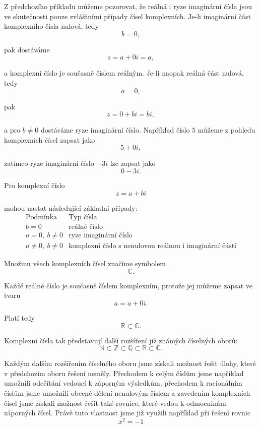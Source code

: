 \documentclass[12pt,a4paper]{article}
\begin{document}
Z předchozího příkladu můžeme pozorovat, 
že reálná i ryze imaginární čísla jsou ve skutečnosti 
pouze zvláštními případy čísel komplexních.
Je-li imaginární část komplexního čísla nulová, tedy
\[
    b=0,
\]

pak dostáváme
\[
    z=a+0i=a,
\]

a komplexní číslo je současně číslem reálným.
Je-li naopak reálná část nulová, tedy
\[
    a=0,
\]

pak
\[
    z=0+bi=bi,
\]

a pro $b\neq0$ dostáváme ryze imaginární číslo.
Například číslo $5$ můžeme z pohledu komplexních čísel zapsat jako
\[
    5+0i,
\]

zatímco ryze imaginární číslo $-3i$ lze zapsat jako
\[
    0-3i.
\]

\begin{notebox}
    Pro komplexní číslo
    \[
        z=a+bi
    \]

    mohou nastat následující základní případy:
    \[
    \begin{array}{c|c}
        \text{Podmínka} & \text{Typ čísla} \\ \hline
        b=0 & \text{reálné číslo} \\
        a=0,\ b\neq0 & \text{ryze imaginární číslo} \\
        a\neq0,\ b\neq0 & \text{komplexní číslo s nenulovou reálnou i imaginární částí}
    \end{array}
    \]
\end{notebox}

Množinu všech komplexních čísel značíme symbolem
\[
    \mathbb{C}.
\]

Každé reálné číslo je současně číslem komplexním, protože jej můžeme zapsat ve tvaru
\[
    a=a+0i.
\]

Platí tedy
\[
    \mathbb{R}\subset\mathbb{C}.
\]

Komplexní čísla tak představují další rozšíření již známých číselných oborů:
\[
    \mathbb{N}
    \subset
    \mathbb{Z}
    \subset
    \mathbb{Q}
    \subset
    \mathbb{R}
    \subset
    \mathbb{C}.
\]

Každým dalším rozšířením číselného oboru jsme získali možnost řešit úlohy,
které v předchozím oboru řešení neměly. 
Přechodem k celým číslům jsme například umožnili odečítání vedoucí k záporným výsledkům, 
přechodem k racionálním číslům jsme umožnili obecné dělení nenulovým číslem 
a zavedením komplexních čísel jsme získali možnost řešit také rovnice, 
které vedou k odmocninám záporných čísel.
Právě tuto vlastnost jsme již využili například při řešení rovnic
\[
    x^2=-1
\]
\end{document}
